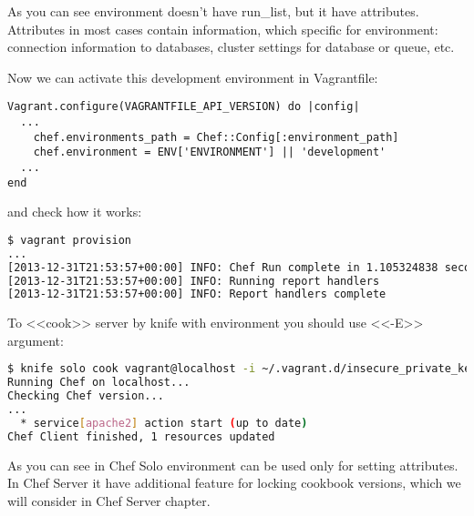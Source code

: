 As you can see environment doesn't have run\_list, but it have attributes. Attributes in most cases contain information, which specific for environment: connection information to databases, cluster settings for database or queue, etc.

Now we can activate this development environment in Vagrantfile:

\begin{lstlisting}[label=lst:my-cloud-chef-environment2,title=my-cloud/Vagrantfile]
Vagrant.configure(VAGRANTFILE_API_VERSION) do |config|
  ...
    chef.environments_path = Chef::Config[:environment_path]
    chef.environment = ENV['ENVIRONMENT'] || 'development'
  ...
end
\end{lstlisting}

and check how it works:

\begin{lstlisting}[language=Bash,label=lst:my-cloud-chef-environment3,title=my-cloud/Vagrantfile]
$ vagrant provision
...
[2013-12-31T21:53:57+00:00] INFO: Chef Run complete in 1.105324838 seconds
[2013-12-31T21:53:57+00:00] INFO: Running report handlers
[2013-12-31T21:53:57+00:00] INFO: Report handlers complete
\end{lstlisting}

To <<cook>> server by knife with environment you should use <<-E>> argument:

\begin{lstlisting}[language=Bash,label=lst:my-cloud-chef-environment4,title=my-cloud/Vagrantfile]
$ knife solo cook vagrant@localhost -i ~/.vagrant.d/insecure_private_key -p 2222 -N web1.example.com -E development
Running Chef on localhost...
Checking Chef version...
...
  * service[apache2] action start (up to date)
Chef Client finished, 1 resources updated
\end{lstlisting}

As you can see in Chef Solo environment can be used only for setting attributes. In Chef Server it have additional feature for locking cookbook versions, which we will consider in Chef Server chapter.
